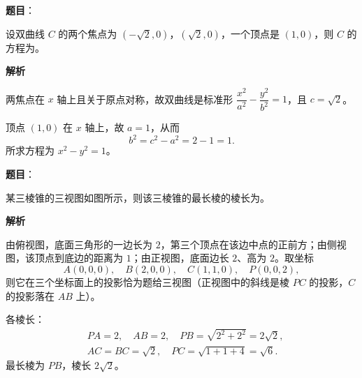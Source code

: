\begin{answer}

\textbf{题目}：

设双曲线 $C$ 的两个焦点为 $(-\sqrt2,0)$，$(\sqrt2,0)$，一个顶点是 $(1,0)$，则 $C$ 的方程为\gkblank{}。

\textbf{解析}

两焦点在 $x$ 轴上且关于原点对称，故双曲线是标准形 $\dfrac{x^2}{a^2}-\dfrac{y^2}{b^2}=1$，且 $c=\sqrt2$。

顶点 $(1,0)$ 在 $x$ 轴上，故 $a=1$，从而
\nopagebreak[4]
\[b^2=c^2-a^2=2-1=1 .\]
所求方程为 $x^2-y^2=1$。


\end{answer}
\begin{answer}

\textbf{题目}：

某三棱锥的三视图如图所示，则该三棱锥的最长棱的棱长为\gkblank{}。
\nopagebreak[4]
\begin{center}\end{center}
\nopagebreak[4]
\textbf{解析}

由俯视图，底面三角形的一边长为 $2$，第三个顶点在该边中点的正前方；由侧视图，该顶点到底边的距离为 $1$；由正视图，底面边长 $2$、高为 $2$。取坐标
\nopagebreak[4]
\[A(0,0,0),\quad B(2,0,0),\quad C(1,1,0),\quad P(0,0,2),\]
则它在三个坐标面上的投影恰为题给三视图（正视图中的斜线是棱 $PC$ 的投影，$C$ 的投影落在 $AB$ 上）。

各棱长：
\nopagebreak[4]
\[\begin{aligned}
&PA=2,\quad AB=2,\quad PB=\sqrt{2^2+2^2}=2\sqrt2,\\
&AC=BC=\sqrt2,\quad PC=\sqrt{1+1+4}=\sqrt6 .
\end{aligned}\]
最长棱为 $PB$，棱长 $2\sqrt2$。


\end{answer}

